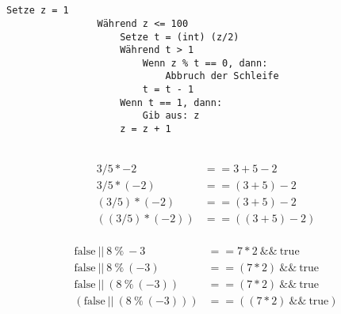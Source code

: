 \documentclass{article}
\begin{document}
    \uebungsblattTitel

    \section*{}
        \subsection{}
            \begin{lstlisting}[autogobble]
                Setze z = 1
                Während z <= 100
                    Setze t = (int) (z/2)
                    Während t > 1
                        Wenn z % t == 0, dann:
                            Abbruch der Schleife
                        t = t - 1
                    Wenn t == 1, dann:
                        Gib aus: z
                    z = z + 1
            \end{lstlisting}
        \subsection{}
            \begin{align}
                \begin{split}
                    3/5*-2&==3+5-2\\
                    3/5*(-2)&==(3+5)-2\\
                    (3/5)*(-2)&==(3+5)-2\\
                    ((3/5)*(-2))&==((3+5)-2)
                \end{split}
            \end{align}

            \begin{align}
                \begin{split}
                    \text{false}\ ||\ 8\ \%\ -3 &== 7 * 2\ \&\&\ \text{true}\\
                    \text{false}\ ||\ 8\ \%\ (-3) &== (7 * 2)\ \&\&\ \text{true}\\
                    \text{false}\ ||\ (8\ \%\ (-3)) &== (7 * 2)\ \&\&\ \text{true}\\
                    (\text{false}\ ||\ (8\ \%\ (-3))) &== ((7 * 2)\ \&\&\ \text{true})
                \end{split}
            \end{align}
\end{document}
